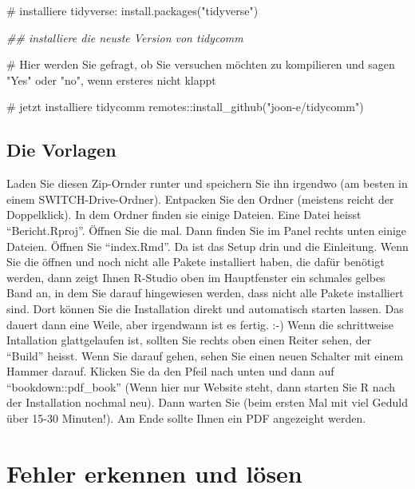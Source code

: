 \documentclass[twoside, pagesize, fontsize=11pt, dvipsnames]{scrreport}
\newenvironment{Shaded}{\begin{snugshade}}{\end{snugshade}}
\newcommand{\CommentTok}[1]{\textcolor[rgb]{0.37,0.37,0.37}{#1}}
\newcommand{\DocumentationTok}[1]{\textcolor[rgb]{0.37,0.37,0.37}{\textit{#1}}}
\newcommand{\FunctionTok}[1]{\textcolor[rgb]{0.28,0.35,0.67}{#1}}
\newcommand{\NormalTok}[1]{\textcolor[rgb]{0.00,0.23,0.31}{#1}}
\newcommand{\SpecialCharTok}[1]{\textcolor[rgb]{0.37,0.37,0.37}{#1}}
\newcommand{\StringTok}[1]{\textcolor[rgb]{0.13,0.47,0.30}{#1}}
\begin{document}
\begin{Shaded}
\begin{Highlighting}[]
\CommentTok{\# installiere tidyverse:}
\FunctionTok{install.packages}\NormalTok{(}\StringTok{"tidyverse"}\NormalTok{) }

\DocumentationTok{\#\# installiere die neuste Version von tidycomm}

\CommentTok{\# Hier werden Sie gefragt, ob Sie versuchen möchten zu kompilieren und sagen "Yes" oder "no", wenn ersteres nicht klappt}

\CommentTok{\# jetzt installiere tidycomm}
\NormalTok{remotes}\SpecialCharTok{::}\FunctionTok{install\_github}\NormalTok{(}\StringTok{"joon{-}e/tidycomm"}\NormalTok{)}
\end{Highlighting}
\end{Shaded}

\hypertarget{die-vorlagen}{%
\section{Die Vorlagen}\label{die-vorlagen}}

Laden Sie diesen Zip-Ornder runter und speichern Sie ihn irgendwo (am
besten in einem SWITCH-Drive-Ordner). Entpacken Sie den Ordner (meistens
reicht der Doppelklick). In dem Ordner finden sie einige Dateien. Eine
Datei heisst \enquote{Bericht.Rproj}. Öffnen Sie die mal. Dann finden
Sie im Panel rechts unten einige Dateien. Öffnen Sie
\enquote{index.Rmd}. Da ist das Setup drin und die Einleitung. Wenn Sie
die öffnen und noch nicht alle Pakete installiert haben, die dafür
benötigt werden, dann zeigt Ihnen R-Studio oben im Hauptfenster ein
schmales gelbes Band an, in dem Sie darauf hingewiesen werden, dass
nicht alle Pakete installiert sind. Dort können Sie die Installation
direkt und automatisch starten lassen. Das dauert dann eine Weile, aber
irgendwann ist es fertig. :-) Wenn die schrittweise Intallation
glattgelaufen ist, sollten Sie rechts oben einen Reiter sehen, der
\enquote{Build} heisst. Wenn Sie darauf gehen, sehen Sie einen neuen
Schalter mit einem Hammer darauf. Klicken Sie da den Pfeil nach unten
und dann auf \enquote{bookdown::pdf\_book} (Wenn hier nur Website steht,
dann starten Sie R nach der Installation nochmal neu). Dann warten Sie
(beim ersten Mal mit viel Geduld über 15-30 Minuten!). Am Ende sollte
Ihnen ein PDF angezeight werden.


\hypertarget{fehler-erkennen-und-luxf6sen}{%
\chapter{Fehler erkennen und lösen}\label{fehler-erkennen-und-luxf6sen}}
\end{document}
